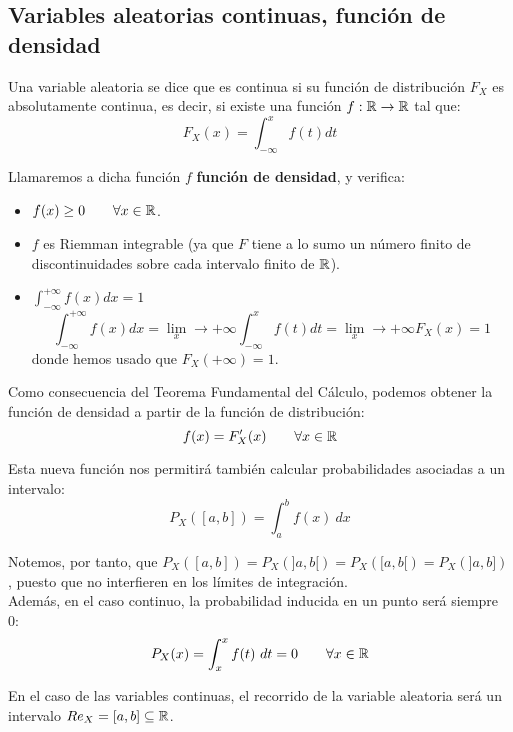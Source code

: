 \subsection{Variables aleatorias continuas, función de densidad}

\begin{definicion}
    Una variable aleatoria se dice que es continua si su función de distribución $F_X$ es absolutamente continua, es decir, si existe una función $f:\mathbb R \rightarrow \mathbb R$ tal que:
    $$F_X(x) = \int_{-\infty}^x f(t) dt$$
\end{definicion}

Llamaremos a dicha función $f$ \textbf{función de densidad}, y verifica:
\begin{itemize}
  \item $f(x) \geq 0 \qquad \forall x \in \mathbb R$.
  \item $f$ es Riemman integrable (ya que $F$ tiene a lo sumo un número finito de discontinuidades sobre cada intervalo finito de $\mathbb R$).
  \item $\displaystyle \int_{-\infty}^{+\infty}f(x) dx = 1$
  \begin{equation*}
      \int_{-\infty}^{+\infty}f(x) dx = \lim_x\to +\infty \int_{-\infty}^x f(t) dt = \lim_x\to +\infty F_X(x) = 1
  \end{equation*}
  donde hemos usado que $F_X(+\infty) = 1$.
\end{itemize}

Como consecuencia del Teorema Fundamental del Cálculo, podemos obtener la función de densidad a partir de la función de distribución:
$$f(x) = F_X'(x) \qquad \forall x \in \mathbb R$$

Esta nueva función nos permitirá también calcular probabilidades asociadas a un intervalo:
$$P_X([a,b]) = \int_a^b f(x)~dx$$

Notemos, por tanto, que $P_X([a,b]) = P_X(]a,b[) = P_X([a,b[) = P_X(]a,b])$, puesto que no interfieren en los límites de integración.\\

Además, en el caso continuo, la probabilidad inducida en un punto será siempre~$0$:
$$P_X(x) = \int_x^x f(t)~dt = 0 \qquad \forall x \in \mathbb R$$

En el caso de las variables continuas, el recorrido de la variable aleatoria será un intervalo $Re_X = [a,b] \subseteq \mathbb R$.

